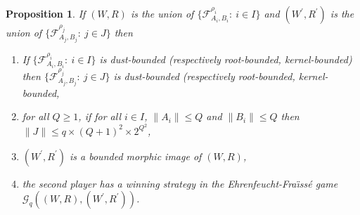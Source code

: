 \documentclass[draft]{article}
\newtheorem{proposition}{Proposition}
\begin{document}
%
%
\begin{proposition}\label{lemma:good:properties:of:delta:reductions:indexed}
%
%
%
%
If $(W,R)$ is the union of $\{{\mathcal F}_{A_{i},B_{i}}^{\rho_{i}}:\ i{\in}I\}$ and $(W^{\prime},R^{\prime})$ is the union of $\{{\mathcal F}_{A_{j},B_{j}}^{\rho_{j}}:\ j{\in}J\}$ then
%
%
\begin{enumerate}
%
%
\item If $\{{\mathcal F}_{A_{i},B_{i}}^{\rho_{i}}:\ i{\in}I\}$ is dust-boun\-ded (respectively root-boun\-ded, kernel-boun\-ded) then $\{{\mathcal F}_{A_{j},B_{j}}^{\rho_{j}}:\ j{\in}J\}$ is dust-boun\-ded (respectively root-boun\-ded, kernel-boun\-ded,
%
%
%
%
\item for all $Q{\geq}1$, if for all $i{\in}I$, ${\parallel}A_{i}{\parallel}{\leq}Q$ and ${\parallel}B_{i}{\parallel}{\leq}Q$ then ${\parallel}J{\parallel}{\leq}q{\times}(Q{+}1)^{2}{\times}
%
%
%
%
%
%
%
%
%
%
%
%
$\linebreak$
%
%
%
%
%
%
%
%
%
%
%
%
2^{Q^{2}}$,
%
%
\item $(W^{\prime},R^{\prime})$ is a bounded morphic image of $(W,R)$,
%
%
\item the second player has a winning strategy in the Ehrenfeucht-Fra\"\i ss\'e game ${\mathcal G}_{q}((W,R),(W^{\prime},R^{\prime}))$.
%
%
\end{enumerate}
%
%
\end{proposition}
%
%
\end{document}
